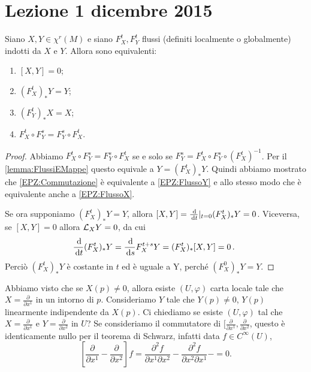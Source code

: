 \chapter{Lezione 1 dicembre 2015}

\begin{proposition} \label{prop:EquivalenzaParentesiZero}
	Siano $X,Y\in\chi^r(M)$ e siano $F_X^t,F_Y^t$ flussi (definiti localmente o globalmente) indotti da $X$ e $Y$. Allora sono equivalenti:
	\begin{enumerate}
	\item $[X,Y]=0$; \label{EPZ:ParentesiZero}
	\item $(F_X^t)_*Y=Y$; \label{EPZ:FlussoY}
	\item $(F_Y^t)_*X=X$; \label{EPZ:FlussoX}
	\item $F_X^t\circ F_Y^s=F_Y^s\circ F_X^t$. \label{EPZ:Commutazione}
	\end{enumerate}
\end{proposition}

\begin{proof}
	Abbiamo $F_X^t\circ F_Y^s=F_Y^s\circ F_X^t$ se e solo se $F_Y^s=F_X^t\circ F_Y^s\circ (F_X^t)^{-1}$. Per il \cref{lemma:FlussiEMappe} questo equivale a $Y=(F_X^t)_*Y$. Quindi abbiamo mostrato che \ref{EPZ:Commutazione} è equivalente a \ref{EPZ:FlussoY} e allo stesso modo che è equivalente anche a \ref{EPZ:FlussoX}.
	
	Se ora supponiamo $(F_X^t)_*Y=Y$, allora $[X,Y]=\frac{\,\mathrm d}{\,\mathrm d t}|_{t=0}(F_X^t)_*Y=0$. Viceversa, se $[X,Y]=0$ allora $\mathcal L_XY=0$, da cui
	\begin{equation*}
		\frac{\,\mathrm d}{\,\mathrm d t}(F_X^t)_*Y=\frac{\,\mathrm d}{\,\mathrm d s}F_X^{t+s}Y=(F_X^t)_*[X,Y]=0\, \text{. }
	\end{equation*}
	Perciò  $(F_X^t)_*Y$ è costante in $t$ ed è uguale a Y, perché $(F_X^0)_*Y=Y$.
\end{proof}

Abbiamo visto che se $X(p)\ne 0$, allora esiste $(U,\varphi)$ carta locale tale che $X=\frac{\partial}{\partial x^1}$ in un intorno di $p$. Consideriamo $Y$ tale che $Y(p)\neq 0$, $Y(p)$ linearmente indipendente da $X(p)$. Ci chiediamo se esiste $(U,\varphi)$ tal che $X=\frac{\partial}{\partial x^1}$ e $Y=\frac{\partial}{\partial x^2}$ in $U$? Se consideriamo il commutatore di $[\frac{\partial}{\partial x^1},\frac{\partial}{\partial x^2}$, questo è identicamente nullo per il teorema di Schwarz, infatti data $f\in C^\infty(U)$, \[[\frac{\partial}{\partial x^1}-\frac{\partial}{\partial x^2}]f=\frac{\partial^2f}{\partial x^1\partial x^2}-\frac{\partial^2f}{\partial x^2\partial x^1}-=0.\]

